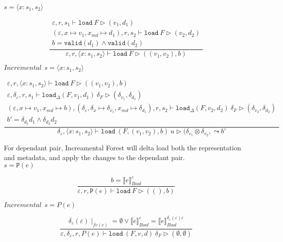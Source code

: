\documentclass[10pt,twoside,a4paper]{article}
\theoremstyle{theorem}
\theoremstyle{lemma}
\theoremstyle{property}
\theoremstyle{definition}
\theoremstyle{assumption}
\begin{document}
$\boxed{s = \langle x : s_1, s_2 \rangle}$

\begin{displaymath}
	\frac{\begin{array}{c}
		\varepsilon, r, s_1 \vdash \mathtt{load}~F \rhd (v_1,d_1)\\
		(\varepsilon, x \mapsto v_1, x_{md} \mapsto d_1), r, s_2 \vdash \mathtt{load}~F \rhd (v_2,d_2)\\
		b = \mathtt{valid}(d_1) \land \mathtt{valid}(d_2)
	\end{array}}
	{\varepsilon, r, \langle x : s_1, s_2 \rangle \vdash \mathtt{load}~F \rhd ((v_1, v_2),b) }
\end{displaymath}

$\boxed{Incremental~~s = \langle x : s_1, s_2 \rangle}$

\begin{displaymath}
	\frac{\begin{array}{c}
		\varepsilon, r, \langle x : s_1, s_2 \rangle \vdash \mathtt{load}~F \rhd ((v_1, v_2),b)\\
		\varepsilon, \delta_\varepsilon, r, s_1 \vdash \mathtt{load}_\Delta (F,v_1,d_1)~ \delta_F \rhd (\delta_{v_1},\delta_{d_1})\\
		(\varepsilon, x \mapsto v_1, x_{md} \mapsto b), (\delta_\varepsilon, \delta_x \mapsto \delta_{v_1}, x_{md} \mapsto \delta_{d_1}), r, s_2 \vdash \mathtt{load}_\Delta (F,v_2,d_2)~ \delta_F \rhd (\delta_{v_2},\delta_{d_2})\\
		b' = \delta_{d_1} d_1 \land \delta_{d_2} d_2
	\end{array}}
	{\delta_\varepsilon, \langle x:s_1,s_2 \rangle \vdash \mathtt{load}~ (F,(v_1,v_2),b)~ u \rhd (\delta_{v_1} \otimes \delta_{v_2}, \leadsto b' }
\end{displaymath}

For dependant pair, Increamental Forest will delta load both the representation and metadata, and apply the changes to the dependant pair.\\

$\boxed{s = \mathtt{P}(e)}$

\begin{displaymath}
	\frac
	{b = \llbracket e \rrbracket^{\varepsilon}_{Bool}}
	{\varepsilon, r, \mathtt{P}(e) \vdash \mathtt{load}~F \rhd ((),b)}
\end{displaymath}

$\boxed{Incremental~~s = P(e)}$

\begin{displaymath}
	\frac{ \delta_\varepsilon(\varepsilon) \mid_{fv(e)} = \emptyset \lor \llbracket e \rrbracket^{\varepsilon}_{Bool} = \llbracket e \rrbracket^{\delta_\varepsilon(\varepsilon) \varepsilon}_{Bool}}
	{\varepsilon, \delta_\varepsilon, r, P(e) \vdash \mathtt{load}~ (F,v,d) ~\delta_F \rhd (\emptyset, \emptyset)}
\end{displaymath}
\end{document}
